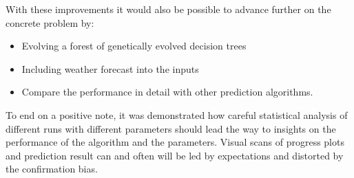\documentclass[conference]{IEEEtran}
\begin{document}
With these improvements it would also be possible to advance further on the concrete problem by:

\begin{itemize}
\item Evolving a forest of genetically evolved decision trees
\item Including weather forecast into the inputs
\item Compare the performance in detail with other prediction algorithms.
\end{itemize}

To end on a positive note, it was demonstrated how careful statistical analysis of different runs with different parameters should lead the way to insights on the performance of the algorithm and the parameters. Visual scans of progress plots and prediction result can and often will be led by expectations and distorted by the confirmation bias.




% 
\end{document}
